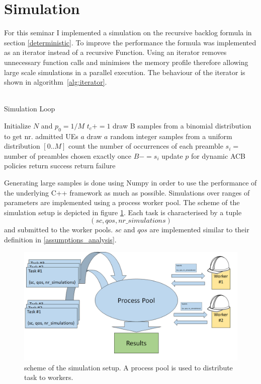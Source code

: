 \documentclass[conference]{IEEEtran}
\begin{document}
\section{Simulation}
For this seminar I implemented a simulation on the recursive backlog formula in section \ref{deterministic}.
To improve the performance the formula was implemented as an iterator instead of a recursive Function.
Using an iterator removes unnecessary function calls and minimises the memory profile therefore allowing large scale simulations in a parallel execution.
The behaviour of the iterator is shown in algorithm~\ref{alg:iterator}.\\\\
\begin{algorithm}
    \caption{Simulation Loop}\label{alg:iterator}
\begin{algorithmic}[1]
    \State Initialize $N$ and $p_0=1/M$
    \State $t_c+=1$
    \State draw B samples from a binomial distribution to get nr. admitted UEs $a$
    \State draw $a$ random integer samples from a uniform distribution $[0.. M]$
    \State count the number of occurrences of each preamble
    \State $s_i= $ number of preambles chosen exactly once
    \State $B -= s_i$
    \State update $p$ for dynamic ACB policies
    \EndWhile
    \State return success
    \Else
    \State return failure
    \EndIf
\end{algorithmic}
\end{algorithm}
Generating large samples is done using Numpy in order to use the performance of the underlying C++ framework as much as possible.
Simulations over ranges of parameters are implemented using a process worker pool. The scheme of the simulation setup is depicted in figure \ref{fig:pool}.
Each task is characterised by a tuple \[(sc, qos, nr\_simulations)\] and submitted to the worker pools.
$sc$ and $qos$ are implemented similar to their definition in \ref{assumptions_analysis}.
\begin{figure}
    \centering
    \includegraphics[width = \columnwidth]{Figures/process_pool_worker.png}
    \caption{scheme of the simulation setup. A process pool is used to distribute task to workers.}
    \label{fig:pool}
\end{figure}
\end{document}
